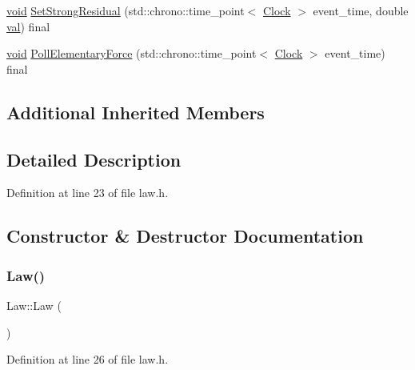 \begin{DoxyCompactItemize}
\item 
\mbox{\hyperlink{glad_8h_a950fc91edb4504f62f1c577bf4727c29}{void}} \mbox{\hyperlink{class_law_ad4a05c77d11ddec40b1e07246cac449d}{Set\+Strong\+Residual}} (std\+::chrono\+::time\+\_\+point$<$ \mbox{\hyperlink{universe_8h_a0ef8d951d1ca5ab3cfaf7ab4c7a6fd80}{Clock}} $>$ event\+\_\+time, double \mbox{\hyperlink{glad_8h_a26942fd2ed566ef553eae82d2c109c8f}{val}}) final
\item 
\mbox{\hyperlink{glad_8h_a950fc91edb4504f62f1c577bf4727c29}{void}} \mbox{\hyperlink{class_law_af99520c95b2cd8af0af110b78b2288ef}{Poll\+Elementary\+Force}} (std\+::chrono\+::time\+\_\+point$<$ \mbox{\hyperlink{universe_8h_a0ef8d951d1ca5ab3cfaf7ab4c7a6fd80}{Clock}} $>$ event\+\_\+time) final
\end{DoxyCompactItemize}
\subsection*{Additional Inherited Members}


\subsection{Detailed Description}


Definition at line 23 of file law.\+h.



\subsection{Constructor \& Destructor Documentation}
\mbox{\label{class_law_a3b94b6e9f09b8f457dba70f3b1c1ab43}} 
\subsubsection{\texorpdfstring{Law()}{Law()}\hspace{0.1cm}{\footnotesize\ttfamily [1/4]}}
{\footnotesize\ttfamily Law\+::\+Law (\begin{DoxyParamCaption}{ }\end{DoxyParamCaption})\hspace{0.3cm}{\ttfamily [inline]}}



Definition at line 26 of file law.\+h.

\mbox{\label{class_law_afd1730474b2806ec6665e16419f4994c}} 
